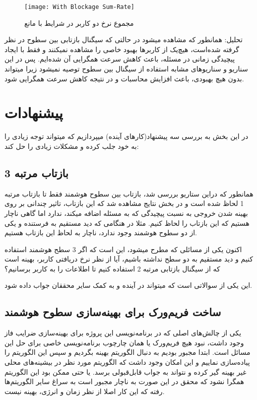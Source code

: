 \begin{figure}[!h]
	\centering
	\texttt{[image: With Blockage Sum-Rate]}
	\caption[
	مجموع نرخ دو کاربر در شرایط با مانع
	]{
		مجموع نرخ دو کاربر در شرایط با مانع
	}
\end{figure}

تحلیل: همانطور که مشاهده میشود در حالتی که سیگنال بازتابی بین سطوح در نظر گرفته شده‌است، هیچ‌یک از کاربرها بهبود خاصی را مشاهده نمیکنند و فقط با ایجاد پیچیدگی زمانی در مسئله، باعث کاهش سرعت همگرایی آن شده‌ایم. پس در این سناریو و سناریوهای مشابه استفاده از سیگنال بین سطوح توصیه نمیشود زیرا میتواند بدون هیچ بهبودی، باعث افزایش محاسبات و در نتیجه کاهش سرعت همگرایی شود.

\newpage
\section{پیشنهادات}

در این بخش به بررسی سه پیشنهاد(کارهای آینده) میپردازیم که میتواند توجه زیادی را به خود جلب کرده و مشکلات زیادی را حل کند:

\subsection{بازتاب مرتبه 3}

همانطور که دراین ستاریو بررسی شد، بازتاب بین سطوح هوشمند فقط تا بازتاب مرتبه 1 لحاظ شده است و در بخش نتایج مشاهده شد که این بازتاب، تاثیر چندانی بر روی بهینه شدن خروجی به نسبت پیچیدگی که به مسئله اضافه میکند، ندارد اما گاهی ناچار هستیم که این بازتاب را لحاظ کنیم. مثلا در هنگامی که دید مستقیم به فرستنده و یکی از دو سطوح هوشمند وجود ندارد، ناچار به لحاظ این بازتاب هستیم. 

اکنون یکی از مسائلی که مطرح میشود، این است که اگر 3 سطح هوشمند استفاده کنیم و دید مستقیم به دو سطح نداشته باشیم، آیا از نظر  نرخ دریافتی کاربر، بهینه است که از سیگنال بازتابی مرتبه 2 استفاده کنیم تا اطلاعات را به کاربر برسانیم؟

این یکی از سوالاتی است که میتواند در آینده و به کمک سایر محققان جواب داده شود. 

\subsection{ساخت فریم‌ورک برای بهینه‌سازی سطوح هوشمند}
یکی از چالش‌های اصلی که در برنامه‌نویسی این پروژه برای بهینه‌سازی ضرایب فاز وجود داشت، نبود هیچ فریم‌ورک یا همان چارچوب برنامه‌نویسی خاصی برای حل این مسائل است. ابتدا مجبور بودیم به دنبال الگوریتم بهینه بگردیم و سپس این الگوریتم را پیاده‌سازی نماییم و این امکان وجود داشت که الگوریتم مورد نظر در بیشینه‌های محلی غیر بهینه گیر کرده و نتواند به جواب قابل‌قبولی برسد. یا حتی ممکن بود این الگوریتم همگرا نشود که محقق در این صورت به ناچار مجبور است به سراغ سایر الگوریتم‌ها رفته که این کار اصلا از نظر زمان و انرژی، بهینه نیست.

